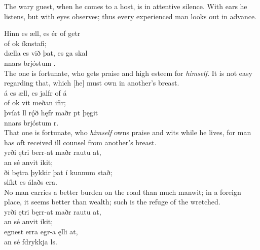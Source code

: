 \bvb The wary guest, when he comes to a host, is in attentive silence\footnotemark[13]. With ears he listens, but with eyes observes; thus every experienced man looks out in advance. \\

\bva Hinn es æll, \hld es ér of getr \\%
\ind {}of ok íknstafi; \\%
dælla es við þat, \hld es ga skal \\%
\ind {}nnars brjóstum .\\%

\bvb The one is fortunate, who gets praise and high esteem for \emph{himself}. It is not easy regarding that, which [he] must own in another's breast. \\

\bva {}á es æll, \hld es jalfr of á \\%
\ind {}of ok vit meðan ifir; \\%
þvíat ll rǫ́ð \hld hęfr maðr pt þęgit \\%
\ind {}nnars brjóstum r.\\%

\bvb That one is fortunate, who \emph{himself} owns praise and wits while he lives, for man has oft received ill counsel from another's breast. \\

\bva {}yrði ętri \hld berr-at maðr rautu at, \\%
\ind an sé anvit ikit; \\%
ði bętra \hld þykkir þat í kunnum stað; \\%
\ind slíkt es álaðs era.\\%

\bvb No man carries a better burden on the road than much manwit; in a foreign place, it seems better than wealth; such is the refuge of the wretched. \\

\bva {}yrði ętri \hld bęrr-at maðr rautu at, \\%
\ind an sé anvit ikit; \\%
egnest erra \hld {}egr-a ęlli at, \\%
\ind an sé fdrykkja ls.\\%

